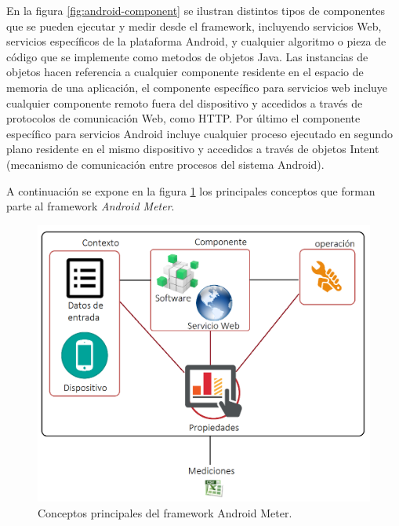 En la figura \ref{fig:android-component} se ilustran distintos tipos
de componentes que se pueden ejecutar y medir desde el framework,
incluyendo servicios Web, servicios específicos de la plataforma Android,
y cualquier algoritmo o pieza de código que se implemente como metodos
de objetos Java. Las instancias de objetos hacen referencia a cualquier
componente residente en el espacio de memoria de una aplicación, el
componente específico para servicios web incluye cualquier componente
remoto fuera del dispositivo y accedidos a través de protocolos de
comunicación Web, como \ac{HTTP}. Por último el componente específico
para servicios Android incluye cualquier proceso ejecutado en segundo
plano residente en el mismo dispositivo y accedidos a través de objetos
Intent (mecanismo de comunicación entre procesos del sistema Android). 

A continuación se expone en la figura \ref{fig:TestingTool-Diagram}
los principales conceptos que forman parte al framework \emph{Android
Meter}. 

\begin{figure}
\begin{centering}
\includegraphics[scale=0.33]{images/TestingTool-Diagram}
\par\end{centering}

\caption{Conceptos principales del framework Android Meter.\label{fig:TestingTool-Diagram}}
\end{figure}


